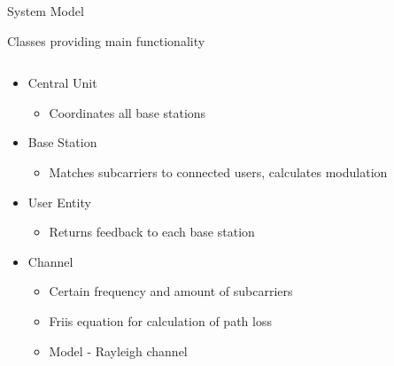 \documentclass[xcolor={cmyk}]{beamer}
\begin{document}
 
  \begin{frame}{System Model}
	 \begin{block}{Classes providing main functionality}
	 	\begin{columns}
			\begin{column}{.9\textwidth}
				\begin{itemize}
					\item Central Unit
					\begin{itemize}
						\item Coordinates all base stations 
					\end{itemize}
					\item Base Station
					\begin{itemize}
						\item Matches subcarriers to connected users, calculates modulation
					\end{itemize}
					\item User Entity
					\begin{itemize}
						\item Returns feedback to each base station
					\end{itemize}
					
					\item Channel
					\begin{itemize}
						\item Certain frequency and amount of subcarriers
						\item Friis equation for calculation of path loss
						\item Model - Rayleigh channel
					\end{itemize}
				\end{itemize}
			\end{column}
		\end{columns}
	 \end{block}
 \end{frame}
 
\end{document}
